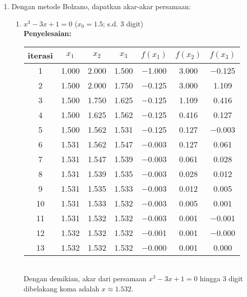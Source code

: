 \documentclass{article}
\newcommand{\penyelesaian}{\textbf{Penyelesaian: }}
\begin{document}
\begin{enumerate}
    \item Dengan metode Bolzano, dapatkan akar-akar persamaan:
    \begin{enumerate}
        \item $x^3 - 3x + 1 = 0$ ($x_0 = \num{1,5}$; s.d. 3 digit) \\
        \penyelesaian \\
        \begin{tabular}{|c|c|c|c|c|c|c|}
            \hline
            iterasi & $x_1$ & $x_2$ & $x_3$ & $f(x_1)$ & $f(x_2)$ & $f(x_3)$ \\
            \hline
            1 & \num{1,000} & \num{2,000} & \num{1,500} & \num{-1,000} & \num{3,000} & \num{-0,125}\\
            2 & \num{1,500} & \num{2,000} & \num{1,750} & \num{-0,125} & \num{3,000} & \num{1,109}\\
            3 & \num{1,500} & \num{1,750} & \num{1,625} & \num{-0,125} & \num{1,109} & \num{0,416}\\
            4 & \num{1,500} & \num{1,625} & \num{1,562} & \num{-0,125} & \num{0,416} & \num{0,127}\\
            5 & \num{1,500} & \num{1,562} & \num{1,531} & \num{-0,125} & \num{0,127} & \num{-0,003}\\
            6 & \num{1,531} & \num{1,562} & \num{1,547} & \num{-0,003} & \num{0,127} & \num{0,061}\\
            7 & \num{1,531} & \num{1,547} & \num{1,539} & \num{-0,003} & \num{0,061} & \num{0,028}\\
            8 & \num{1,531} & \num{1,539} & \num{1,535} & \num{-0,003} & \num{0,028} & \num{0,012}\\
            9 & \num{1,531} & \num{1,535} & \num{1,533} & \num{-0,003} & \num{0,012} & \num{0,005}\\
            10 & \num{1,531} & \num{1,533} & \num{1,532} & \num{-0,003} & \num{0,005} & \num{0,001}\\
            11 & \num{1,531} & \num{1,532} & \num{1,532} & \num{-0,003} & \num{0,001} & \num{-0,001}\\
            12 & \num{1,532} & \num{1,532} & \num{1,532} & \num{-0,001} & \num{0,001} & \num{-0,000}\\
            13 & \num{1,532} & \num{1,532} & \num{1,532} & \num{-0,000} & \num{0,001} & \num{0,000}\\
             \hline
            \end{tabular} \\
        Dengan demikian, akar dari persamaan $x^3 - 3x + 1 = 0$ hingga 3 digit dibelakang koma adalah $x \approx \num{1,532}$.
            

\end{enumerate}
\end{enumerate}
\end{document}
